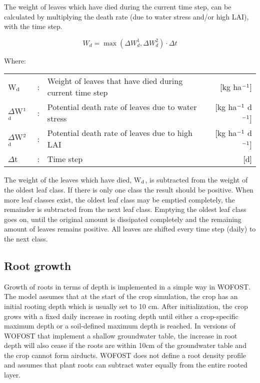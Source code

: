 The weight of leaves which have died during the current time step, can be calculated by
multiplying the death rate (due to water stress and/or high LAI), with the time step.

\begin{equation}
W_{d} = \max(\Delta W_{d}^{1} , \Delta W_{d}^{2})\cdot \Delta t
\end{equation}

Where:\\[5pt]
\begin{tabularx}{\textwidth}{llXr}
	W$_{{\rm d}}$ &:& Weight of leaves that have died during 
	current time step    &    [kg ha$^{{\rm -1}}$]\\
	$\Delta$W$^{{\rm 1}}$$_{{\rm d}}$ &:& Potential death rate of leaves due 
	to water stress   &      [kg ha$^{{\rm -1}}$ d$^{{\rm -1}}$]\\
	$\Delta$W$^{{\rm 2}}$$_{{\rm d}}$ &:& Potential death rate of leaves due to 
	high LAI   &     [kg ha$^{{\rm -1}}$ d$^{{\rm -1}}$]\\
	$\Delta$t &:& Time step    &    [d]\\
\end{tabularx}

The weight of the leaves which have died, W$_{{\rm d}}$, is subtracted from the weight of the oldest
leaf class. If there is only one class the result should be positive. When more leaf classes
exist, the oldest leaf class may be emptied completely, the remainder is subtracted from
the next leaf class. Emptying the oldest leaf class goes on, until the original amount is
dissipated completely and the remaining amount of leaves remains positive. All leaves are
shifted every time step (daily) to the next class.

\subsection{Root growth}
\label{sec:rootgrowth}

Growth of roots in terms of depth is implemented in a simple way in WOFOST. 
The model assumes that at the start of the crop simulation, the crop has an initial rooting 
depth which is usually set to 10 cm. After initialization, the crop grows with a fixed daily 
increase in rooting depth until either a crop-specific maximum depth or a soil-defined maximum 
depth is reached. In versions of WOFOST that implement a shallow groundwater table, the 
increase in root depth will also cease if the roots are within 10cm of the groundwater 
table and the crop cannot form airducts. WOFOST does not define a root density profile 
and assumes that plant roots can subtract water equally from the entire rooted layer.

